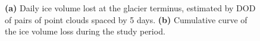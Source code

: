 \begin{figure}
  \centering
  \caption{\textbf{(a)} Daily ice volume lost at the glacier terminus, estimated by DOD of pairs of point clouds spaced by 5 days. \textbf{(b)} Cumulative curve of the ice volume loss during the study period.}
  \label{fig:4:volumes_variation}
\end{figure}

